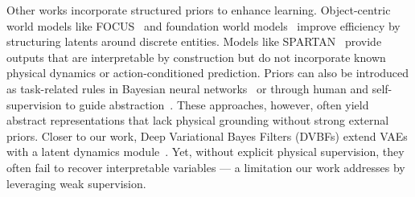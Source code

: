 \documentclass[nonacm,sigconf]{acmart}
\begin{document}
Other works incorporate structured priors to enhance learning. Object-centric world models like FOCUS~\cite[]{ferraro2023focus} and foundation world models~\cite{mao2024zero} improve efficiency by structuring latents around discrete entities. Models like SPARTAN~\cite []{lei2024spartan} provide outputs that are interpretable by construction but do not incorporate known physical dynamics or action-conditioned prediction. Priors can also be introduced as task-related rules in Bayesian neural networks~\cite[]{sam2024bayesian} or through human and self-supervision to guide abstraction~\cite[]{fu2021learning, wen2023any, konidaris2018skills, peng2024human, chen2022automated}. These approaches, however, often yield abstract representations that lack physical grounding without strong external priors. Closer to our work, Deep Variational Bayes Filters (DVBFs) extend VAEs with a latent dynamics module~\cite[]{karl2016deep}. Yet, without explicit physical supervision, they often fail to recover interpretable variables --- a limitation our work addresses by leveraging weak supervision.
\end{document}
